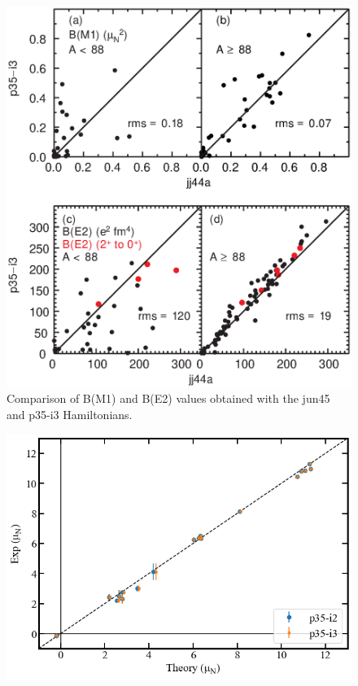 \documentclass[aps,prl,twocolumn,tightenlines,superscriptaddress,showpacs]{revtex4-1}
\begin{document}
\begin{figure}
\includegraphics[scale=0.40]{ba.eps}
\caption{Comparison of B(M1) and B(E2) values obtained with the
jun45 and p35-i3 Hamiltonians.
}
\label{ (8) }
\end{figure}




\begin{figure}
\includegraphics[scale=0.35]{dipoles.png}
\caption{
}
\label{ (9) }
\end{figure}
\end{document}
